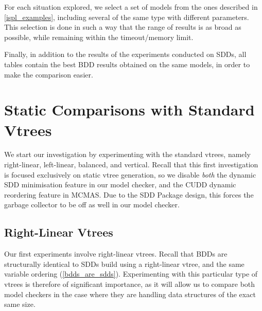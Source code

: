 \documentclass[11pt]{report}
\begin{document}
For each situation explored, we select a set of models from the ones described in \ref{ispl_examples}, including several of the same type with different parameters. This selection is done in such a way that the range of results is as broad as possible, while remaining within the timeout/memory limit. 

Finally, in addition to the results of the experiments conducted on SDDs, all tables contain the best BDD results obtained on the same models, in order to make the comparison easier.

\section{Static Comparisons with Standard Vtrees}

We start our investigation by experimenting with the standard vtrees, namely right-linear, left-linear, balanced, and vertical. Recall that this first investigation is focused exclusively on static vtree generation, so we disable \textit{both }the dynamic SDD minimisation feature in our model checker, and the CUDD dynamic reordering feature in MCMAS. Due to the SDD Package design, this forces the garbage collector to be off as well in our model checker.

\subsection{Right-Linear Vtrees} 

Our first experiments involve right-linear vtrees. Recall that BDDs are structurally identical to SDDs build using a right-linear vtree, and the same variable ordering (\ref{bdds_are_sdds}). Experimenting with this particular type of vtrees is therefore of significant importance, as it will allow us to compare both model checkers in the case where they are handling data structures of the exact same size.
\end{document}
